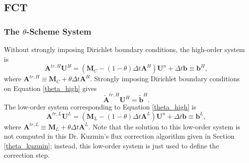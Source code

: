 \subsection{FCT}
\subsubsection{The $\theta$-Scheme System}
Without strongly imposing Dirichlet boundary conditions, the high-order system is
\begin{equation}\label{theta_high}
   \mathbf{A}^{tr,H}\mathbf{U}^H
      = (\mathbf{M}_C-(1-\theta)\Delta t\mathbf{A}^H)\mathbf{U}^n
      + \Delta t\mathbf{b} \equiv \mathbf{b}^H,
\end{equation}
where $\mathbf{A}^{tr,H} \equiv \mathbf{M}_C+\theta\Delta t\mathbf{A}^H$.
Strongly imposing Dirichlet boundary conditions on Equation \ref{theta_high}
gives
\begin{equation}\label{theta_highD}
   \tilde{\mathbf{A}}^{tr,H}\mathbf{U}^H
      = \tilde{\mathbf{b}}^H.
\end{equation}
The low-order system corresponding to Equation \ref{theta_high} is
\begin{equation}\label{theta_low}
   \mathbf{A}^{tr,L}\mathbf{U}^L
      = (\mathbf{M}_L-(1-\theta)\Delta t\mathbf{A}^L)\mathbf{U}^n
      + \Delta t\mathbf{b} \equiv \mathbf{b}^L,
\end{equation}
where $\mathbf{A}^{tr,L} \equiv \mathbf{M}_L+\theta\Delta t\mathbf{A}^L$.
Note that the solution to this low-order system
is not computed in this Dr. Kuzmin's flux correction algorithm given in Section
\ref{theta_kuzmin}; instead, this low-order system is just used
to define the correction step.
